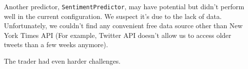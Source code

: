 \documentclass[twocolumn,10pt]{asme2ej}
\begin{document}
Another predictor, \verb|SentimentPredictor|, may have potential but didn't
perform well in the current configuration. We suspect it's due to the lack of
data. Unfortunately, we couldn't find any convenient free data source other than
New York Times API (For example, Twitter API doesn't allow us to access older
tweets than a few weeks anymore).

The trader had even harder challenges. 






\end{document}
